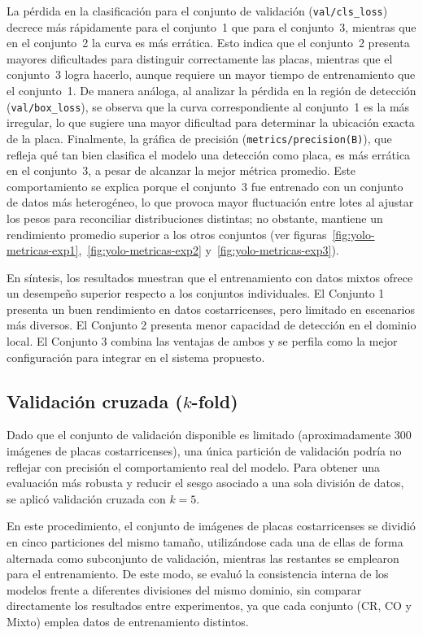 La pérdida en la clasificación para el conjunto de validación (\texttt{val/cls\_loss})
decrece más rápidamente para el conjunto~1 que para el conjunto~3, 
mientras que en el conjunto~2 la curva es más errática.
Esto indica que el conjunto~2 presenta mayores dificultades para distinguir correctamente las placas,
mientras que el conjunto~3 logra hacerlo, aunque requiere un mayor tiempo de entrenamiento que el conjunto~1.
De manera análoga, al analizar la pérdida en la región de detección (\texttt{val/box\_loss}),
se observa que la curva correspondiente al conjunto~1 es la más irregular,
lo que sugiere una mayor dificultad para determinar la ubicación exacta de la placa.
Finalmente, la gráfica de precisión (\texttt{metrics/precision(B)}),
que refleja qué tan bien clasifica el modelo una detección como placa,
es más errática en el conjunto~3, a pesar de alcanzar la mejor métrica promedio.
Este comportamiento se explica porque el conjunto~3 fue entrenado con un conjunto de datos más heterogéneo,
lo que provoca mayor fluctuación entre lotes al ajustar los pesos para reconciliar distribuciones distintas;
no obstante, mantiene un rendimiento promedio superior a los otros conjuntos 
(ver figuras~\ref{fig:yolo-metricas-exp1},~\ref{fig:yolo-metricas-exp2} y~\ref{fig:yolo-metricas-exp3}).

En síntesis, los resultados muestran que el entrenamiento con datos mixtos 
ofrece un desempeño superior respecto a los conjuntos individuales. 
El Conjunto 1 presenta un buen rendimiento en datos costarricenses,
pero limitado en escenarios más diversos. 
El Conjunto 2 presenta menor capacidad de detección en el dominio local. 
El Conjunto 3 combina las ventajas de ambos y
se perfila como la mejor configuración para integrar en el sistema propuesto.


\subsection{Validación cruzada ($k$-fold)}

Dado que el conjunto de validación disponible es limitado (aproximadamente 300 imágenes de placas costarricenses), 
una única partición de validación podría no reflejar con precisión el comportamiento real del modelo. 
Para obtener una evaluación más robusta y reducir el sesgo asociado a una sola división de datos, 
se aplicó validación cruzada con $k=5$.

En este procedimiento, el conjunto de imágenes de placas costarricenses se dividió en cinco particiones del mismo tamaño, 
utilizándose cada una de ellas de forma alternada como subconjunto de validación, 
mientras las restantes se emplearon para el entrenamiento. 
De este modo, se evaluó la consistencia interna de los modelos frente a diferentes divisiones del mismo dominio, 
sin comparar directamente los resultados entre experimentos, 
ya que cada conjunto (CR, CO y Mixto) emplea datos de entrenamiento distintos.

